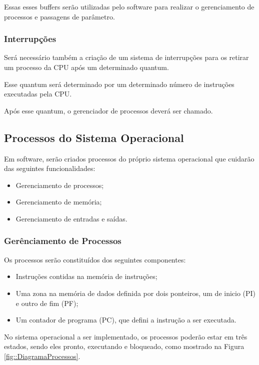Essas esses buffers serão utilizadas pelo software para realizar o gerenciamento de processos e passagens de parâmetro.


\subsubsection{Interrupções}

Será necessário também a criação de um sistema de interrupções para os retirar um processo da CPU após um determinado quantum.

Esse quantum será determinado por um determinado número de instruções executadas pela CPU.

Após esse quantum, o gerenciador de processos deverá ser chamado.


\subsection{Processos do Sistema Operacional}

Em software, serão criados processos do próprio sistema operacional que cuidarão das seguintes funcionalidades:

\begin{itemize}
	\item Gerenciamento de processos;
	\item Gerenciamento de memória;
	\item Gerenciamento de entradas e saídas.
\end{itemize}

\subsubsection{Gerênciamento de Processos}

Os processos serão constituídos dos seguintes componentes:

\begin{itemize}
	\item Instruções contidas na memória de instruções;
	
	\item Uma zona na memória de dados definida por dois ponteiros, um de inicio (PI) e outro de fim (PF);
	
	\item Um contador de programa (PC), que defini a instrução a ser executada. 
\end{itemize}

No sistema operacional a ser implementado, os processos poderão estar em três estados, sendo eles pronto, executando e bloqueado, como mostrado na Figura \ref{fig::DiagramaProcessos}.

